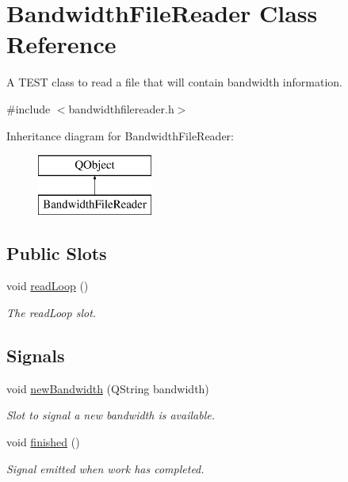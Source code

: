 \hypertarget{classBandwidthFileReader}{\section{Bandwidth\-File\-Reader Class Reference}
\label{classBandwidthFileReader}
}


A T\-E\-S\-T class to read a file that will contain bandwidth information.  




{\ttfamily \#include $<$bandwidthfilereader.\-h$>$}

Inheritance diagram for Bandwidth\-File\-Reader\-:\begin{figure}[H]
\begin{center}
\leavevmode
\includegraphics[height=2.000000cm]{classBandwidthFileReader}
\end{center}
\end{figure}
\subsection*{Public Slots}
\begin{DoxyCompactItemize}
\item 
void \hyperlink{classBandwidthFileReader_a49c0d54f1342d5e9c89645ef4a8d6d50}{read\-Loop} ()
\begin{DoxyCompactList}\small\item\em The read\-Loop slot. \end{DoxyCompactList}\end{DoxyCompactItemize}
\subsection*{Signals}
\begin{DoxyCompactItemize}
\item 
void \hyperlink{classBandwidthFileReader_abd0490c2362d76086fd6b2c741357a44}{new\-Bandwidth} (Q\-String bandwidth)
\begin{DoxyCompactList}\small\item\em Slot to signal a new bandwidth is available. \end{DoxyCompactList}\item 
void \hyperlink{classBandwidthFileReader_a1d2d50deda4271b620377958bf756d9f}{finished} ()
\begin{DoxyCompactList}\small\item\em Signal emitted when work has completed. \end{DoxyCompactList}\end{DoxyCompactItemize}
